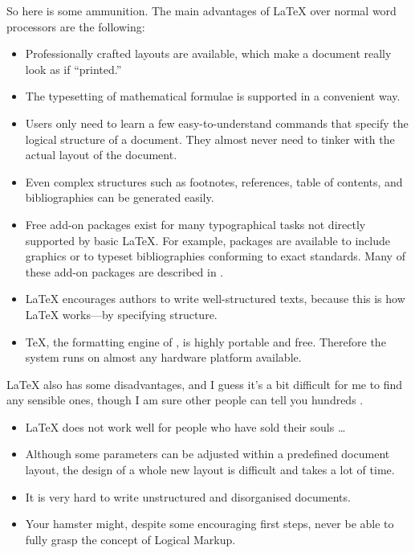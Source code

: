 \medskip\noindent So here is some ammunition. The main advantages
of \LaTeX{} over normal word processors are the following:

\begin{itemize}

  \item Professionally crafted layouts are available, which make a
        document really look as if ``printed.''
  \item The typesetting of mathematical formulae is supported in a
        convenient way.
  \item Users only need to learn a few easy-to-understand commands
        that specify the logical structure of a document. They almost never
        need to tinker with the actual layout of the document.
  \item Even complex structures such as footnotes, references, table of
        contents, and bibliographies can be generated easily.
  \item Free add-on packages exist for many typographical tasks not directly
        supported by basic \LaTeX. For example, packages are available to
        include \PSi{} graphics or to typeset bibliographies conforming to
        exact standards. Many of these add-on packages are described in
        \companion.
  \item \LaTeX{} encourages authors to write well-structured texts,
        because this is how \LaTeX{} works---by specifying structure.
  \item \TeX, the formatting engine of \LaTeXe, is highly portable and free.
        Therefore the system runs on almost any hardware platform
        available.

\end{itemize}

\medskip

\noindent\LaTeX{} also has some disadvantages, and I guess it's a bit
difficult for me to find any sensible ones, though I am sure other people
can tell you hundreds \smiley.

\begin{itemize}
  \item \LaTeX{} does not work well for people who have sold their
        souls \ldots
  \item Although some parameters can be adjusted within a predefined
        document layout, the design of a whole new layout is difficult and
        takes a lot of time.
  \item It is very hard to write unstructured and disorganised documents.
  \item Your hamster might, despite some encouraging first steps, never be
        able to fully grasp the concept of Logical Markup.
\end{itemize}

